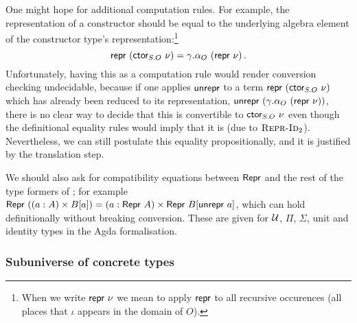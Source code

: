 One might hope for additional computation rules. For example, the representation
of a constructor should be equal to the underlying algebra element of the
constructor type's representation:\footnote{When we write $\Mrepr\ \nu$ we mean
to apply $\textsf{repr}$ to all recursive occurences (all places that $\iota$ appears
in the domain of $O$).} \[\textsf{repr}\ (\textsf{ctor}_{S.O}\ \nu) = \gamma.\alpha_O\ (\textsf{repr}
\ \nu) \,.\] Unfortunately, having this as a computation rule would render
conversion checking undecidable, because if one applies $\textsf{unrepr}$ to a term
$\textsf{repr}\ (\textsf{ctor}_{S.O}\ \nu)$ which has already been reduced to its
representation, $\mta{unrepr}\ (\gamma.\alpha_O\ (\Mrepr\ \nu))$, there is no
clear way to decide that this is convertible to $\textsf{ctor}_{S.O}\ \nu$ even though
the definitional equality rules would imply that it is (due to
\hyperlink{Repr-Id2}{$\textsc{Repr-Id}_2$}). Nevertheless, we can still postulate this equality
propositionally, and it is justified by the translation step.

We should also ask for compatibility equations between $\textsf{Repr}$ and the rest of
the type formers of \lambdamltt; for example $\textsf{Repr}\ ((a : A) \times B[a]) = (a
: \textsf{Repr}\ A) \times \textsf{Repr}\ B[\textsf{unrepr}\ a]$, which can hold definitionally
without breaking conversion. These are given for $\mathcal{U}$, $\Pi$, $\Sigma$, unit
and identity types in the Agda formalisation.


\subsubsection{Subuniverse of concrete types}

